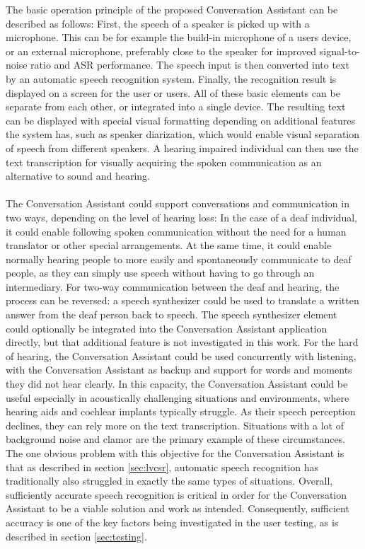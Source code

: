 \documentclass[english, 12pt, a4paper, pdftex, elec, utf8]{aaltothesis}
\begin{document}
The basic operation principle of the proposed Conversation Assistant can be described as follows: First, the speech of a speaker is picked up with a microphone. This can be for example the build-in microphone of a users device, or an external microphone, preferably close to the speaker for improved signal-to-noise ratio and ASR performance. The speech input is then converted into text by an automatic speech recognition system. Finally, the recognition result is displayed on a screen for the user or users. All of these basic elements can be separate from each other, or integrated into a single device. The resulting text can be displayed with special visual formatting depending on additional features the system has, such as speaker diarization, which would enable visual separation of speech from different speakers. A hearing impaired individual can then use the text transcription for visually acquiring the spoken communication as an alternative to sound and hearing. \\\\
The Conversation Assistant could support conversations and communication in two ways, depending on the level of hearing loss: In the case of a deaf individual, it could enable following spoken communication without the need for a human translator or other special arrangements. At the same time, it could enable normally hearing people to more easily and spontaneously communicate to deaf people, as they can simply use speech without having to go through an intermediary. For two-way communication between the deaf and hearing, the process can be reversed: a speech synthesizer could be used to translate a written answer from the deaf person back to speech. The speech synthesizer element could optionally be integrated into the Conversation Assistant application directly, but that additional feature is not investigated in this work. For the hard of hearing, the Conversation Assistant could be used concurrently with listening, with the Conversation Assistant as backup and support for words and moments they did not hear clearly. In this capacity, the Conversation Assistant could be useful especially in acoustically challenging situations and environments, where hearing aids and cochlear implants typically struggle. As their speech perception declines, they can rely more on the text transcription. Situations with a lot of background noise and clamor are the primary example of these circumstances. The one obvious problem with this objective for the Conversation Assistant is that as described in section \ref{sec:lvcsr}, automatic speech recognition has traditionally also struggled in exactly the same types of situations. Overall, sufficiently accurate speech recognition is critical in order for the Conversation Assistant to be a viable solution and work as intended. Consequently, sufficient accuracy is one of the key factors being investigated in the user testing, as is described in section \ref{sec:testing}.
\end{document}
